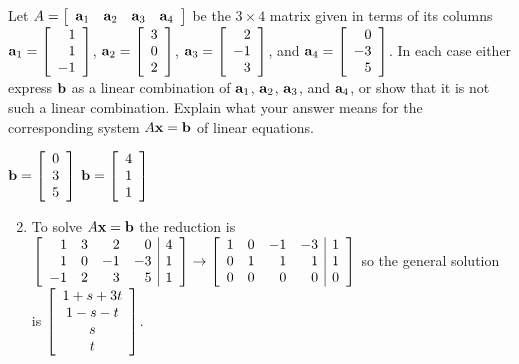\begin{multicols}{2}
\begin{ex}
Let $A = \left[ \begin{array}{cccc}
\textbf{a}_{1} & \textbf{a}_{2} & \textbf{a}_{3} & \textbf{a}_{4}
\end{array} \right]$ be the $3 \times 4$ matrix given in terms of its columns  $\textbf{a}_{1} = \left[ \begin{array}{r}
1 \\
1 \\
-1
\end{array} \right]$, $\textbf{a}_{2} = \left[ \begin{array}{r}
3 \\
0 \\
2
\end{array} \right]$, $\textbf{a}_{3} = \left[ \begin{array}{r}
2 \\
-1 \\
3
\end{array} \right]$, and $\textbf{a}_{4} = \left[ \begin{array}{r}
0 \\
-3 \\
5
\end{array} \right]$.
 In each case either express $\textbf{b}$ as a linear combination of $\textbf{a}_{1}$, $\textbf{a}_{2}$, $\textbf{a}_{3}$, and $\textbf{a}_{4}$, or show that it is not such a linear combination. Explain what your answer means for the corresponding system $A\textbf{x} = \textbf{b}$ of linear equations.
\begin{exenumerate}
\exitem 
$\textbf{b} = \left[ \begin{array}{r}
0 \\
3 \\
5
\end{array} \right]$
\exitem 
$\textbf{b} = \left[ \begin{array}{r}
4 \\
1 \\
1
\end{array} \right]$
\end{exenumerate}
\begin{sol}
\begin{enumerate}[label={\alph*.}]
\setcounter{enumi}{1}
\item
To solve $A\textbf{x} = \textbf{b}$ the reduction is $\left[ \begin{array}{rrrr|r}
1 & 3 & 2 & 0 & 4 \\
1 & 0 & -1 & -3 & 1 \\
-1 & 2 & 3 & 5 & 1
\end{array} \right] \rightarrow \left[ \begin{array}{rrrr|r}
1 & 0 & -1 & -3 & 1 \\
0 & 1 & 1 & 1 & 1 \\
0 & 0 & 0 & 0 & 0
\end{array} \right]$
 so the general solution is $\left[ \begin{array}{c}
 1 + s + 3t \\
 1 - s -t \\
 s \\
 t
 \end{array} \right]$.




\end{enumerate}
\end{sol}
\end{ex}
\end{multicols}
